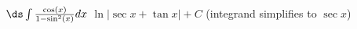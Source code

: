 {$\ds \int \frac{\cos (x)}{1-\sin ^2(x)} dx $}
{$\ln|\sec x+\tan x|+C$ (integrand simplifies to $\sec x$)}